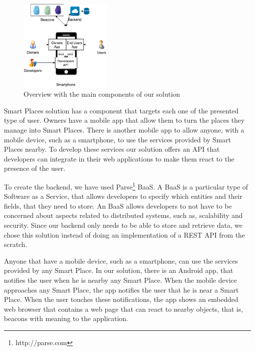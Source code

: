 \begin{figure}[!ht]
  \centering
    \includegraphics[width=0.4\textwidth, keepaspectratio]{figures/smart_places_solution_overview}
    \caption[Solution Overview]{Overview with the main components of our solution}
    \label{fig:solution_overview}
\end{figure}

Smart Places solution has a component that targets each one of the presented type of user.
Owners have a mobile app that allow them to turn the places they manage into Smart Places.
There is another mobile app to allow anyone, with a mobile device, such as a smartphone, to use the services provided by Smart Places nearby.
To develop these services our solution offers an \gls{API} that developers can integrate in their web applications to make them react to the presence of the user.

To create the backend, we have used Parse\footnote{http://parse.com} \gls{BaaS}. A \gls{BaaS} is a particular type of Software as a Service, that allows developers to specify which entities and their fields, that they need to store.
An \gls{BaaS} allows developers to not have to be concerned about aspects related to distributed systems, such as, scalability and security.
Since our backend only needs to be able to store and retrieve data, we chose this solution instead of doing an implementation of a \gls{REST} \gls{API} from the scratch.

Anyone that have a mobile device, such as a smartphone, can use the services provided by any Smart Place.
In our solution, there is an Android app, that notifies the user when he is nearby any Smart Place.
When the mobile device approaches any Smart Place, the app notifies the user that he is near a Smart Place.
When the user touches these notifications, the app shows an embedded web browser that contains a web page that can react to nearby objects, that is, beacons with meaning to the application.

